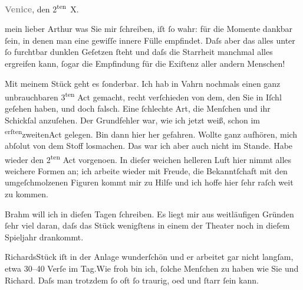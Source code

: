 \pstart
           \raggedleft{}\textcolor{gray}{\textbf{Venice}}, den 2\textsuperscript{ten} X.\pend
           
\pstart{}mein lieber Arthur\pend\vspace{0.5em}
\pstart
           was Sie mir ſchreiben, iſt ſo wahr: für die Momente dankbar ſein, in denen man eine
               gewiſſe innere Fülle empfindet. Daſs aber das alles unter ſo furchtbar dunklen
               Geſetzen ſteht und daſs die Starrheit manchmal alles ergreifen {\pb}kann, ſogar die Empfindung für die
               Exiſtenz aller andern Menschen!\pend
           
\pstart
           Mit meinem Stück geht es
               ſonderbar. Ich hab in Vahrn nochmals einen ganz
               unbrauchbaren 3\textsuperscript{ten} Act gemacht, recht verſchieden von
               dem, den Sie in Iſchl geſehen haben, und doch
               falsch. Eine ſchlechte Art, die Menſchen und ihr Schickſal anzuſehen. Der Grundfehler
               war, wie ich jetzt weiß, schon im \substVorne{}\textsuperscript{erſten}\substDazwischen{}zweiten\substHinten{}{ }Act gelegen. Bin dann hier her
               gefahren. Wollte ganz aufhören, mich abſolut von dem Stoff losmachen. Das war ich
               aber auch nicht im Stande. Habe wieder den 2\textsuperscript{ten}{ }Act vorgeno{\geminationm}en. In dieſer weichen helleren Luft hier {\pb}nimmt alles weichere Formen an;
               ich arbeite wieder mit Freude, die Bekanntſchaft mit den umgeſchmolzenen Figuren
               kommt mir zu Hilfe und ich hoffe hier ſehr raſch weit zu kommen.\pend
           
\pstart
           Brahm will ich in dieſen Tagen ſchreiben. Es
               liegt mir aus weitläufigen Gründen ſehr viel daran, daſs das Stück wenigſtens in einem der Theater noch
               in dieſem Spieljahr drankommt.\pend
           
\pstart
           RichardsStück iſt in der Anlage wunderſchön und er arbeitet gar
               nicht langſam, etwa 30–40 Verſe {\pb}im Tag.\hspace*{1.5em}Wie froh bin ich, ſolche Menſchen zu haben
               wie Sie und Richard. Daſs man trotzdem ſo  oft ſo traurig, oed und ſtarr ſein kann.\pend
           
